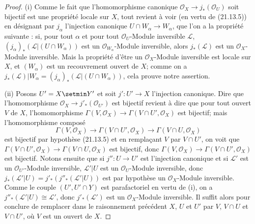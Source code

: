 \begin{proof}
(i) Comme le fait que l'homomorphisme canonique
$\mathcal O_X\to j_*(\mathcal O_U)$ soit bijectif est une propriété locale sur $X$,
tout revient à voir (en vertu de (21.13.5)) en désignant par
$j_\alpha$ l'injection canonique $U\cap W_\alpha\to W_\alpha$, que l'on a la propriété
suivante : si, pour tout $\alpha$ et pour tout $\mathcal O_U$-Module inversible
$\mathscr L$, $(j_\alpha)_*(\mathscr L|(U\cap W_\alpha))$ est un
$\mathcal O_{W_\alpha}$-Module inversible, alors $j_*(\mathscr L)$ est un
$\mathcal O_X$-Module inversible. Mais la propriété d'être un $\mathcal O_X$-Module
inversible est locale sur $X$, et $(W_\alpha)$ est un recouvrement ouvert de $X$;
comme on a
$j_*(\mathscr L)|W_\alpha=(j_\alpha)_*(\mathscr L|(U\cap W_\alpha))$, cela prouve notre assertion.

(ii) Posons $U'=X\setmin Y'$ et soit $j':U'\to X$ l'injection canonique. Dire que
l'homomorphisme $\mathcal O_X\to j'_*(\mathcal O_{U'})$ est bijectif revient à dire
que pour tout ouvert $V$ de $X$, l'homomorphisme
$\Gamma(V,\mathcal O_X)\to\Gamma(V\cap U',\mathcal O_X)$ est bijectif; mais
l'homomorphisme composé
\[
  \Gamma(V,\mathcal O_X)\longrightarrow\Gamma(V\cap U',\mathcal O_X)
  \longrightarrow\Gamma(V\cap U,\mathcal O_X)
\]
est bijectif par hypothèse (21.13.5) et en remplaçant $V$ par $V\cap U'$, on voit que
$\Gamma(V\cap U',\mathcal O_X)\to\Gamma(V\cap U,\mathcal O_X)$ est bijectif, donc
$\Gamma(V,\mathcal O_X)\to\Gamma(V\cap U',\mathcal O_X)$ est bijectif. Notons ensuite
que si $j'':U\to U'$ est l'injection canonique et si $\mathscr L'$ est un
$\mathcal O_{U'}$-Module inversible, $\mathscr L'|U$ est un $\mathcal O_U$-Module
inversible, donc
$j_*(\mathscr L'|U)=j'_*(j''_*(\mathscr L'|U))$ est par hypothèse un
$\mathcal O_X$-Module inversible. Comme le couple $(U',U'\cap Y)$ est parafactoriel
en vertu de (i), on a $j''_*(\mathscr L'|U)\cong\mathscr L'$, donc
$j'_*(\mathscr L')$ est un $\mathcal O_X$-Module inversible. Il suffit alors pour
conclure de remplacer dans le raisonnement précédent $X$, $U$ et $U'$ par $V$,
$V\cap U$ et $V\cap U'$, où $V$ est un ouvert de $X$.


\end{proof}
